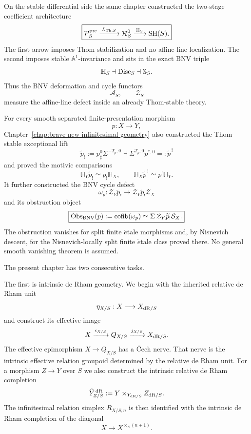 On the stable differential side the same chapter constructed the two-stage
coefficient architecture
\[
\boxed{
    \mathcal P_S^{\mathrm{pre}}
    \xrightarrow{\,L_{\mathrm{Th},S}\,}
    \mathcal R_S^0
    \xrightarrow{\,\mathbb H_S\,}
    \mathrm{SH}(S).
}
\]
The first arrow imposes Thom stabilization and no affine-line localization.
The second imposes stable \(\mathbb A^1\)-invariance and sits in the exact BNV
triple
\[
    \mathbb H_S\dashv\operatorname{Disc}_S\dashv\mathbb S_S.
\]
Thus the BNV deformation and cycle functors
\[
    \mathcal A_S,\qquad \mathcal Z_S
\]
measure the affine-line defect inside an already Thom-stable theory.

For every smooth separated finite-presentation morphism
\[
    p:X\longrightarrow Y,
\]
Chapter~\ref{chap:brave-new-infinitesimal-geometry} also constructed the
Thom-stable exceptional lift
\[
\boxed{
    \widetilde p_!
    :=
    p_\sharp^0\Sigma^{-T_p,0}
    \dashv
    \Sigma^{T_p,0}p^{*,0}
    =:
    \widetilde p^{\,!}
}
\]
and proved the motivic comparisons
\[
\boxed{
    \mathbb H_Y\widetilde p_!
    \simeq
    p_!\mathbb H_X,
    \qquad
    \mathbb H_X\widetilde p^{\,!}
    \simeq
    p^!\mathbb H_Y.
}
\]
It further constructed the BNV cycle defect
\[
    \omega_p:
    \mathcal Z_Y\widetilde p_!
    \longrightarrow
    \mathcal Z_Y\widetilde p_!\mathcal Z_X
\]
and its obstruction object
\[
\boxed{
    \operatorname{Obs}_{\mathrm{BNV}}(p)
    :=
    \operatorname{cofib}(\omega_p)
    \simeq
    \Sigma\,\mathcal Z_Y\widetilde p_!\mathcal S_X.
}
\]
The obstruction vanishes for split finite \(\acute{e}\)tale morphisms and,
by Nisnevich descent, for the Nisnevich-locally split finite
\(\acute{e}\)tale class proved there.  No general smooth vanishing theorem is
assumed.

The present chapter has two consecutive tasks.

The first is intrinsic de Rham geometry.  We begin with the inherited
relative de Rham unit
\[
    \eta_{X/S}:X\longrightarrow X_{\mathrm{dR}/S}
\]
and construct its effective image
\[
    X\xrightarrow{\epsilon_{X/S}}Q_{X/S}
      \xrightarrow{\jmath_{X/S}}X_{\mathrm{dR}/S}.
\]
The effective epimorphism \(X\to Q_{X/S}\) has a \v{C}ech nerve.  That nerve
is the intrinsic effective relation groupoid determined by the relative de
Rham unit.  For a morphism \(Z\to Y\) over \(S\) we also construct the
intrinsic relative de Rham completion
\[
    \widehat Y^{\,\mathrm{dR}}_{Z/S}
    :=
    Y\times_{Y_{\mathrm{dR}/S}}Z_{\mathrm{dR}/S}.
\]
The infinitesimal relation simplex \(R_{X/S,n}\) is then identified with the
intrinsic de Rham completion of the diagonal
\[
    X\longrightarrow X^{\times_S(n+1)}.
\]

